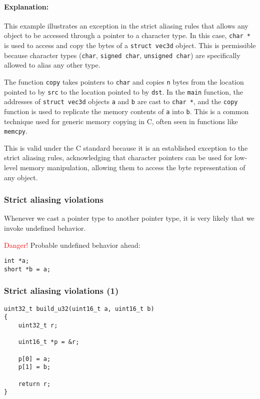 \documentclass[12pt]{article}
\begin{document}
\paragraph{Explanation:}
This example illustrates an exception in the strict aliasing rules that allows any object to be accessed through a pointer to a character type. In this case, \texttt{char *} is used to access and copy the bytes of a \texttt{struct vec3d} object. This is permissible because character types (\texttt{char}, \texttt{signed char}, \texttt{unsigned char}) are specifically allowed to alias any other type.

The function \texttt{copy} takes pointers to \texttt{char} and copies \texttt{n} bytes from the location pointed to by \texttt{src} to the location pointed to by \texttt{dst}. In the \texttt{main} function, the addresses of \texttt{struct vec3d} objects \texttt{a} and \texttt{b} are cast to \texttt{char *}, and the \texttt{copy} function is used to replicate the memory contents of \texttt{a} into \texttt{b}. This is a common technique used for generic memory copying in C, often seen in functions like \texttt{memcpy}.

This is valid under the C standard because it is an established exception to the strict aliasing rules, acknowledging that character pointers can be used for low-level memory manipulation, allowing them to access the byte representation of any object.

\subsubsection{Strict aliasing violations}

Whenever we cast a pointer type to another pointer type, it is very likely that we invoke undefined behavior.

\textcolor{red}{Danger!} Probable undefined behavior ahead:

\begin{lstlisting}
int *a;
short *b = a;
\end{lstlisting}
\subsubsection{Strict aliasing violations (1)}

\begin{lstlisting}
uint32_t build_u32(uint16_t a, uint16_t b)
{
    uint32_t r;

    uint16_t *p = &r;

    p[0] = a;
    p[1] = b;

    return r;
}
\end{lstlisting}
\end{document}
